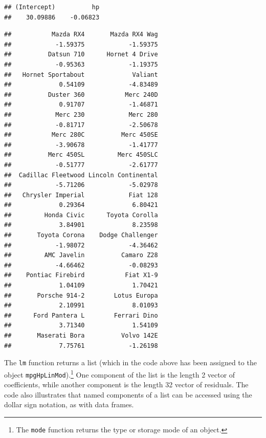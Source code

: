 \documentclass[
]{krantz}
\newenvironment{Shaded}{\begin{snugshade}}{\end{snugshade}}
\newcommand{\NormalTok}[1]{#1}
\newcommand{\OperatorTok}[1]{\textcolor[rgb]{0.81,0.36,0.00}{\textbf{#1}}}
\begin{document}
\begin{Shaded}
\end{Shaded}

\begin{verbatim}
## (Intercept)          hp 
##    30.09886    -0.06823
\end{verbatim}

\begin{Shaded}
\end{Shaded}

\begin{verbatim}
##           Mazda RX4       Mazda RX4 Wag 
##            -1.59375            -1.59375 
##          Datsun 710      Hornet 4 Drive 
##            -0.95363            -1.19375 
##   Hornet Sportabout             Valiant 
##             0.54109            -4.83489 
##          Duster 360           Merc 240D 
##             0.91707            -1.46871 
##            Merc 230            Merc 280 
##            -0.81717            -2.50678 
##           Merc 280C          Merc 450SE 
##            -3.90678            -1.41777 
##          Merc 450SL         Merc 450SLC 
##            -0.51777            -2.61777 
##  Cadillac Fleetwood Lincoln Continental 
##            -5.71206            -5.02978 
##   Chrysler Imperial            Fiat 128 
##             0.29364             6.80421 
##         Honda Civic      Toyota Corolla 
##             3.84901             8.23598 
##       Toyota Corona    Dodge Challenger 
##            -1.98072            -4.36462 
##         AMC Javelin          Camaro Z28 
##            -4.66462            -0.08293 
##    Pontiac Firebird           Fiat X1-9 
##             1.04109             1.70421 
##       Porsche 914-2        Lotus Europa 
##             2.10991             8.01093 
##      Ford Pantera L        Ferrari Dino 
##             3.71340             1.54109 
##       Maserati Bora          Volvo 142E 
##             7.75761            -1.26198
\end{verbatim}

The \texttt{lm} function returns a list (which in the code above has been assigned to the object \texttt{mpgHpLinMod}).\footnote{The \texttt{mode} function returns the type or storage mode of an object.} One component of the list is the length 2 vector of coefficients, while another component is the length 32 vector of residuals. The code also illustrates that named components of a list can be accessed using the dollar sign notation, as with data frames.
\end{document}
